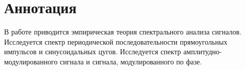 \section*{Аннотация}

В работе приводится эмпирическая теория спектрального анализа сигналов. Исследуется спектр периодической последовательности прямоугольных импульсов и синусоидальных цугов. Исследуется спектр амплитудно-модулированного сигнала и сигнала, модулированного по фазе.